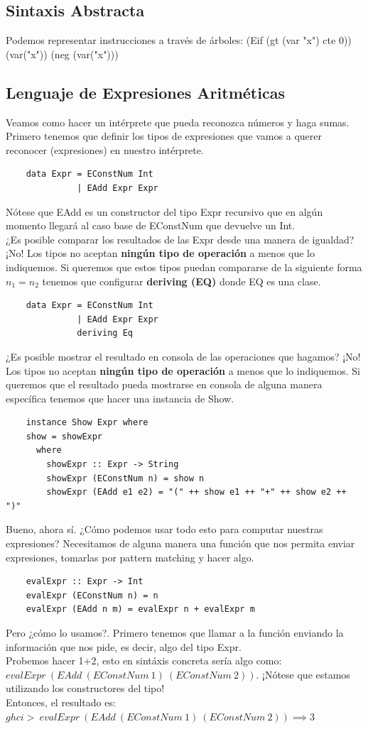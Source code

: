 \documentclass[10pt,a4paper]{article}
\begin{document}
\subsection*{Sintaxis Abstracta}
Podemos representar instrucciones a través de árboles: (Eif (gt (var "x") cte 0)) (var("x")) (neg (var("x")))
\subsection*{Lenguaje de Expresiones Aritméticas}
Veamos como hacer un intérprete que pueda reconozca números y haga sumas. \\
Primero tenemos que definir los tipos de expresiones que vamos a querer reconocer (expresiones) en nuestro intérprete.
\begin{lstlisting}
    data Expr = EConstNum Int 
              | EAdd Expr Expr 
\end{lstlisting}
Nótese que EAdd es un constructor del tipo Expr recursivo que en algún momento llegará al caso base de EConstNum que devuelve un Int. \\
¿Es posible comparar los resultados de las Expr desde una manera de igualdad? ¡No! Los tipos no aceptan \textbf{ningún tipo de operación} a menos que lo indiquemos. Si queremos que estos tipos puedan compararse de la siguiente forma $n_{1} = n_{2}$ tenemos que configurar \textbf{deriving (EQ)} donde EQ es una clase. 
\begin{lstlisting}
    data Expr = EConstNum Int 
              | EAdd Expr Expr 
              deriving Eq
\end{lstlisting}
¿Es posible mostrar el resultado en consola de las operaciones que hagamos? ¡No! Los tipos no aceptan \textbf{ningún tipo de operación} a menos que lo indiquemos. Si queremos que el resultado pueda mostrarse en consola de alguna manera específica tenemos que hacer una instancia de Show. 
\begin{lstlisting}
    instance Show Expr where
    show = showExpr
      where 
        showExpr :: Expr -> String 
        showExpr (EConstNum n) = show n
        showExpr (EAdd e1 e2) = "(" ++ show e1 ++ "+" ++ show e2 ++ ")"
\end{lstlisting}
Bueno, ahora sí. ¿Cómo podemos usar todo esto para computar nuestras expresiones? Necesitamos de alguna manera una función que nos permita enviar expresiones, tomarlas por pattern matching y hacer algo. 
\begin{lstlisting}
    evalExpr :: Expr -> Int
    evalExpr (EConstNum n) = n
    evalExpr (EAdd n m) = evalExpr n + evalExpr m
\end{lstlisting}
Pero ¿cómo lo usamos?. Primero tenemos que llamar a la función enviando la información que nos pide, es decir, algo del tipo Expr. \\
Probemos hacer 1+2, esto en sintáxis concreta sería algo como: $evalExpr \ (EAdd \ (EConstNum \ 1) \ (EConstNum \ 2))$. ¡Nótese que estamos utilizando los constructores del tipo! \\
Entonces, el resultado es: $ghci> \ evalExpr \ (EAdd \ (EConstNum \ 1) \ (EConstNum \ 2)) \implies 3$
\end{document}
